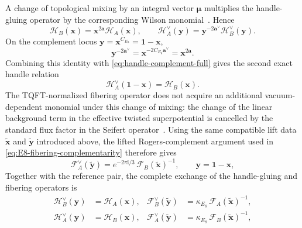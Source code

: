 \documentclass[11pt,a4paper]{article}
\numberwithin{equation}{section}
\begin{document}
A change of topological mixing by an integral vector $\boldsymbol\mu$ multiplies the handle-gluing operator by the corresponding Wilson monomial~\cite{Closset:2017zgf}.  Hence
\begin{equation}
  \mathcal H_B(\boldsymbol x)
  =\boldsymbol x^{2\boldsymbol a}\mathcal H_A(\boldsymbol x),
  \qquad
  \mathcal H_A^\vee(\boldsymbol y)
  =\boldsymbol y^{-2\boldsymbol a^\vee}\mathcal H_B^\vee(\boldsymbol y).
  \label{eq:AB-shifted-handle-operators}
\end{equation}
On the complement locus $\boldsymbol y=\boldsymbol x^{C_{E_8}}=\boldsymbol1-\boldsymbol x$,
\begin{equation}
  \boldsymbol y^{-2\boldsymbol a^\vee}
  =\boldsymbol x^{-2C_{E_8}\boldsymbol a^\vee}
  =\boldsymbol x^{2\boldsymbol a}.
  \label{eq:AB-mixing-monomial-identity}
\end{equation}
Combining this identity with \eqref{eq:handle-complement-full} gives the second exact handle relation
\begin{equation}
  \mathcal H_A^\vee(\boldsymbol1-\boldsymbol x)
  =\mathcal H_B(\boldsymbol x).
  \label{eq:dual-A-original-B-handle}
\end{equation}
The TQFT-normalized fibering operator does not acquire an additional vacuum-dependent monomial under this change of mixing: the change of the linear background term in the effective twisted superpotential is cancelled by the standard flux factor in the Seifert operator~\cite{Closset:2017zgf}.  Using the same compatible lift data $\widetilde{\boldsymbol x}$ and $\widetilde{\boldsymbol y}$ introduced above, the lifted Rogers-complement argument used in \eqref{eq:E8-fibering-complementarity} therefore gives
\begin{equation}
  \mathcal F_A^\vee(\widetilde{\boldsymbol y})
  =e^{-2\pi \mathrm{i}/3}\,
  \mathcal F_B(\widetilde{\boldsymbol x})^{-1},
  \qquad
  \boldsymbol y=\boldsymbol1-\boldsymbol x,
  \label{eq:dual-A-original-B-fibering}
\end{equation}
Together with the reference pair, the complete exchange of the handle-gluing and fibering operators is
\begin{align}
  \mathcal H_B^\vee(\boldsymbol y)
  &=\mathcal H_A(\boldsymbol x),
  &
  \mathcal F_B^\vee(\widetilde{\boldsymbol y})
  &=\kappa_{E_8}\,\mathcal F_A(\widetilde{\boldsymbol x})^{-1},
  \nonumber\\
  \mathcal H_A^\vee(\boldsymbol y)
  &=\mathcal H_B(\boldsymbol x),
  &
  \mathcal F_A^\vee(\widetilde{\boldsymbol y})
  &=\kappa_{E_8}\,\mathcal F_B(\widetilde{\boldsymbol x})^{-1},
  \label{eq:complete-AB-operator-exchange}
\end{align}
\end{document}
